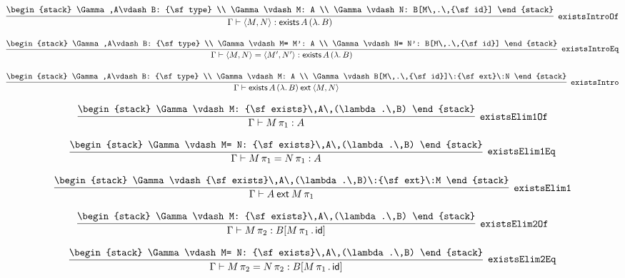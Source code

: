 \[
\infer[{\tt existsIntroOf}]{\Gamma \vdash \langle M,N\rangle : {\sf exists}\,A\,(\lambda .\,B)}{
\begin{stack}
\Gamma ,A\vdash B: {\sf type}
\\
\Gamma \vdash M: A
\\
\Gamma \vdash N: B[M\,.\,{\sf id}]
\end{stack}}
\]

\[
\infer[{\tt existsIntroEq}]{\Gamma \vdash \langle M,N\rangle = \langle M',N'\rangle : {\sf exists}\,A\,(\lambda .\,B)}{
\begin{stack}
\Gamma ,A\vdash B: {\sf type}
\\
\Gamma \vdash M= M': A
\\
\Gamma \vdash N= N': B[M\,.\,{\sf id}]
\end{stack}}
\]

\[
\infer[{\tt existsIntro}]{\Gamma \vdash {\sf exists}\,A\,(\lambda .\,B)\:{\sf ext}\:\langle M,N\rangle }{
\begin{stack}
\Gamma ,A\vdash B: {\sf type}
\\
\Gamma \vdash M: A
\\
\Gamma \vdash B[M\,.\,{\sf id}]\:{\sf ext}\:N
\end{stack}}
\]

\[
\infer[{\tt existsElim1Of}]{\Gamma \vdash M\, \pi_1: A}{
\begin{stack}
\Gamma \vdash M: {\sf exists}\,A\,(\lambda .\,B)
\end{stack}}
\]

\[
\infer[{\tt existsElim1Eq}]{\Gamma \vdash M\, \pi_1= N\, \pi_1: A}{
\begin{stack}
\Gamma \vdash M= N: {\sf exists}\,A\,(\lambda .\,B)
\end{stack}}
\]

\[
\infer[{\tt existsElim1}]{\Gamma \vdash A\:{\sf ext}\:M\, \pi_1}{
\begin{stack}
\Gamma \vdash {\sf exists}\,A\,(\lambda .\,B)\:{\sf ext}\:M
\end{stack}}
\]

\[
\infer[{\tt existsElim2Of}]{\Gamma \vdash M\, \pi_2: B[M\, \pi_1\,.\,{\sf id}]}{
\begin{stack}
\Gamma \vdash M: {\sf exists}\,A\,(\lambda .\,B)
\end{stack}}
\]

\[
\infer[{\tt existsElim2Eq}]{\Gamma \vdash M\, \pi_2= N\, \pi_2: B[M\, \pi_1\,.\,{\sf id}]}{
\begin{stack}
\Gamma \vdash M= N: {\sf exists}\,A\,(\lambda .\,B)
\end{stack}}
\]

